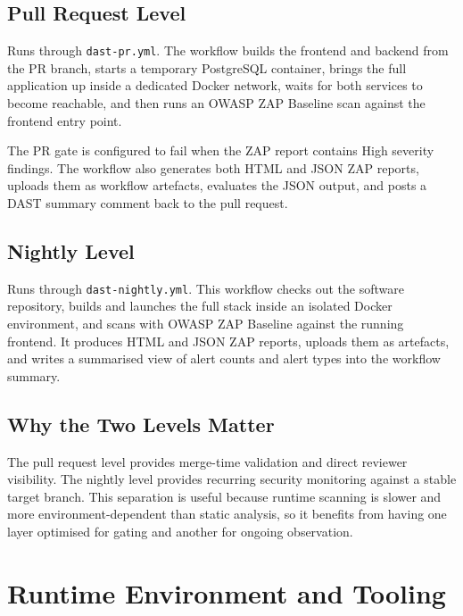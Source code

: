 \documentclass[12pt,a4paper]{report}
\begin{document}
\subsection{Pull Request Level}

Runs through \texttt{dast-pr.yml}. The workflow builds the frontend and backend from the PR branch, starts a temporary PostgreSQL container, brings the full application up inside a dedicated Docker network, waits for both services to become reachable, and then runs an OWASP ZAP Baseline scan against the frontend entry point.

The PR gate is configured to fail when the ZAP report contains High severity findings. The workflow also generates both HTML and JSON ZAP reports, uploads them as workflow artefacts, evaluates the JSON output, and posts a DAST summary comment back to the pull request.

\subsection{Nightly Level}

Runs through \texttt{dast-nightly.yml}. This workflow checks out the software repository, builds and launches the full stack inside an isolated Docker environment, and scans with OWASP ZAP Baseline against the running frontend. It produces HTML and JSON ZAP reports, uploads them as artefacts, and writes a summarised view of alert counts and alert types into the workflow summary.

\subsection{Why the Two Levels Matter}

The pull request level provides merge-time validation and direct reviewer visibility. The nightly level provides recurring security monitoring against a stable target branch. This separation is useful because runtime scanning is slower and more environment-dependent than static analysis, so it benefits from having one layer optimised for gating and another for ongoing observation.

\section{Runtime Environment and Tooling}
\end{document}
